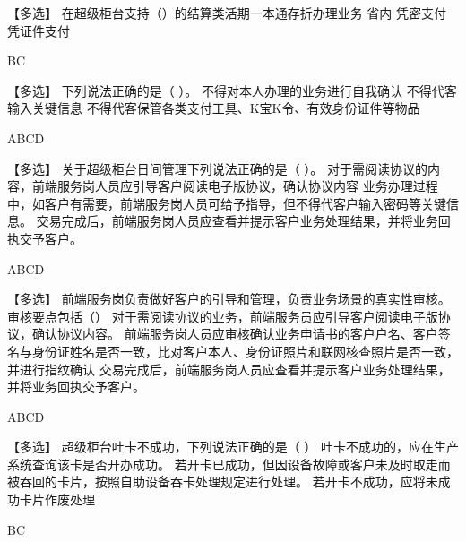 \documentclass[kindlepaper]{BHCexam4kindle}
\begin{document}
\begin{questions}
\qs 【多选】 在超级柜台支持（）的结算类活期一本通存折办理业务 \xx
{} {  省内 } { 凭密支付 } { 凭证件支付 }
\begin{solution} BC \end{solution}
\qs 【多选】 下列说法正确的是（  ）。 \xx
{} {  不得对本人办理的业务进行自我确认 } { 不得代客输入关键信息 } { 不得代客保管各类支付工具、K宝K令、有效身份证件等物品 }
\begin{solution} ABCD \end{solution}
\qs 【多选】 关于超级柜台日间管理下列说法正确的是（  ）。 \xx
{} {  对于需阅读协议的内容，前端服务岗人员应引导客户阅读电子版协议，确认协议内容 } { 业务办理过程中，如客户有需要，前端服务岗人员可给予指导，但不得代客户输入密码等关键信息。 } { 交易完成后，前端服务岗人员应查看并提示客户业务处理结果，并将业务回执交予客户。 }
\begin{solution} ABCD \end{solution}
\qs 【多选】 前端服务岗负责做好客户的引导和管理，负责业务场景的真实性审核。审核要点包括（） \xx
{} {  对于需阅读协议的业务，前端服务员应引导客户阅读电子版协议，确认协议内容。 } { 前端服务岗人员应审核确认业务申请书的客户户名、客户签名与身份证姓名是否一致，比对客户本人、身份证照片和联网核查照片是否一致，并进行指纹确认 } { 交易完成后，前端服务岗人员应查看并提示客户业务处理结果，并将业务回执交予客户。 }
\begin{solution} ABCD \end{solution}
\qs 【多选】 超级柜台吐卡不成功，下列说法正确的是（ ） \xx
{} {  吐卡不成功的，应在生产系统查询该卡是否开办成功。 } { 若开卡已成功，但因设备故障或客户未及时取走而被吞回的卡片，按照自助设备吞卡处理规定进行处理。 } { 若开卡不成功，应将未成功卡片作废处理 }
\begin{solution} BC \end{solution}

\end{questions}
\end{document}
